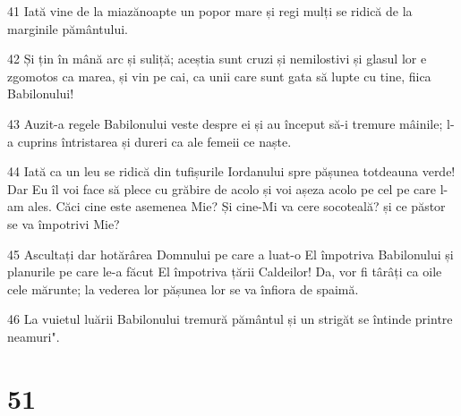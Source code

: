 \par 41 Iată vine de la miazănoapte un popor mare și regi mulți se ridică de la marginile pământului.
\par 42 Și țin în mână arc și suliță; aceștia sunt cruzi și nemilostivi și glasul lor e zgomotos ca marea, și vin pe cai, ca unii care sunt gata să lupte cu tine, fiica Babilonului!
\par 43 Auzit-a regele Babilonului veste despre ei și au început să-i tremure mâinile; l-a cuprins întristarea și dureri ca ale femeii ce naște.
\par 44 Iată ca un leu se ridică din tufișurile Iordanului spre pășunea totdeauna verde! Dar Eu îl voi face să plece cu grăbire de acolo și voi așeza acolo pe cel pe care l-am ales. Căci cine este asemenea Mie? Și cine-Mi va cere socoteală? și ce păstor se va împotrivi Mie?
\par 45 Ascultați dar hotărârea Domnului pe care a luat-o El împotriva Babilonului și planurile pe care le-a făcut El împotriva țării Caldeilor! Da, vor fi târâți ca oile cele mărunte; la vederea lor pășunea lor se va înfiora de spaimă.
\par 46 La vuietul luării Babilonului tremură pământul și un strigăt se întinde printre neamuri".

\chapter{51}

